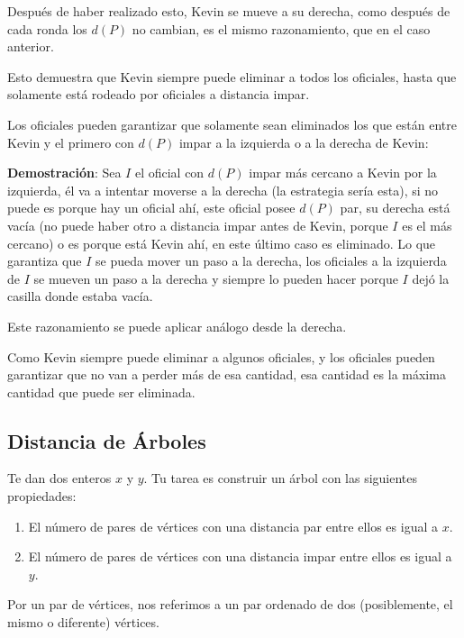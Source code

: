 \documentclass[14pt]{extarticle}
\begin{document}
    Después de haber realizado esto, Kevin se mueve a su derecha, como después de cada ronda los $d(P)$ no cambian, es el mismo razonamiento, que en el caso anterior.
    
    Esto demuestra que Kevin siempre puede eliminar a todos los oficiales, hasta que solamente está rodeado por oficiales a distancia impar.
    
    Los oficiales pueden garantizar que solamente sean eliminados los que están entre Kevin y el primero con $d(P)$ impar a la izquierda o a la derecha de Kevin:
    
    \textbf{Demostración}: Sea $I$ el oficial con $d(P)$ impar más cercano a Kevin por la izquierda, él va a intentar moverse a la derecha (la estrategia sería esta), si no puede es porque hay un oficial ahí, este oficial posee $d(P)$ par, su derecha está vacía (no puede haber otro a distancia impar antes de Kevin, porque $I$ es el más cercano) o es porque está Kevin ahí, en este último caso es eliminado. Lo que garantiza que $I$ se pueda mover un paso a la derecha, los oficiales a la izquierda de $I$ se mueven un paso a la derecha y siempre lo pueden hacer porque $I$ dejó la casilla donde estaba vacía.
    
    Este razonamiento se puede aplicar análogo desde la derecha.
    
    Como Kevin siempre puede eliminar a algunos oficiales, y los oficiales pueden garantizar que no van a perder más de esa cantidad, esa cantidad es la máxima cantidad que puede ser eliminada.
        
\subsection*{Distancia de Árboles}

\begin{tcolorbox}[colback=blue!5!white,colframe=blue!75!black, title = Distancia de Árboles]

    Te dan dos enteros $x$ y $y$. Tu tarea es construir un árbol con las siguientes propiedades:

    \begin{enumerate}
        \item El número de pares de vértices con una distancia par entre ellos es igual a $x$.
        \item El número de pares de vértices con una distancia impar entre ellos es igual a $y$.    
    \end{enumerate}

    Por un par de vértices, nos referimos a un par ordenado de dos (posiblemente, el mismo o diferente) vértices.

\end{tcolorbox}
\end{document}
